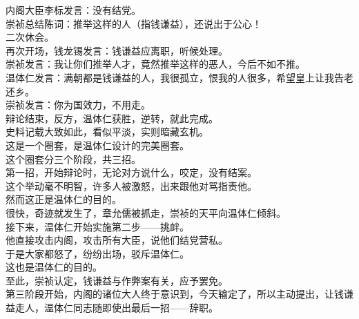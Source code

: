 \begin{multicols}{\theparacolNo}
内阁大臣李标发言：没有结党。\\

崇祯总结陈词：推举这样的人（指钱谦益），还说出于公心！\\

二次休会。\\

再次开场，钱龙锡发言：钱谦益应离职，听候处理。\\

崇祯发言：我让你们推举人才，竟然推举这样的恶人，今后不如不推。\\

温体仁发言：满朝都是钱谦益的人，我很孤立，恨我的人很多，希望皇上让我告老还乡。\\

崇祯发言：你为国效力，不用走。\\

辩论结束，反方，温体仁获胜，逆转，就此完成。\\

史料记载大致如此，看似平淡，实则暗藏玄机。\\

这是一个圈套，是温体仁设计的完美圈套。\\

这个圈套分三个阶段，共三招。\\

第一招，开始辩论时，无论对方说什么，咬定，没有结案。\\

这个举动毫不明智，许多人被激怒，出来跟他对骂指责他。\\

然而这正是温体仁的目的。\\

很快，奇迹就发生了，章允儒被抓走，崇祯的天平向温体仁倾斜。\\

接下来，温体仁开始实施第二步——挑衅。\\

他直接攻击内阁，攻击所有大臣，说他们结党营私。\\

于是大家都怒了，纷纷出场，驳斥温体仁。\\

这也是温体仁的目的。\\

至此，崇祯认定，钱谦益与作弊案有关，应予罢免。\\

第三阶段开始，内阁的诸位大人终于意识到，今天输定了，所以主动提出，让钱谦益走人，温体仁同志随即使出最后一招——辞职。\\


\end{multicols}
